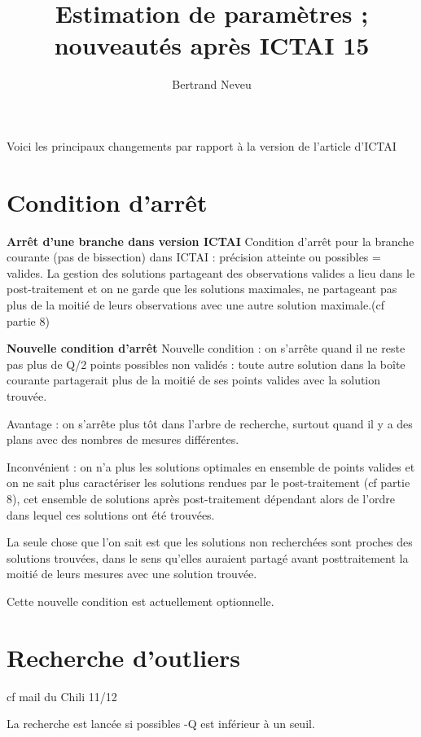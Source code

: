 \documentclass{article}
\title {Estimation de param\`etres ;  nouveaut\'es apr\`es ICTAI 15}
\author{Bertrand Neveu}
\begin{document}
\maketitle

Voici les principaux changements par rapport \`a la version de l'article d'ICTAI

\section{Condition d'arr\^et}


{\bf Arr\^et d'une branche dans version ICTAI}
   Condition d'arr\^et pour la branche courante (pas de bissection) dans ICTAI : pr\'ecision atteinte ou possibles = valides.
 La gestion des solutions partageant des observations valides a lieu dans le post-traitement et on ne garde
que les solutions maximales, ne partageant pas plus de la moiti\'e de leurs observations avec une autre solution maximale.(cf partie 8)

{\bf Nouvelle condition d'arr\^et}
   Nouvelle condition :  on s'arr\^ete quand il ne reste pas plus de Q/2 points possibles non valid\'es : 
   toute autre solution dans la bo\^ite courante partagerait plus de la moiti\'e de ses points valides avec la solution trouv\'ee.

   
Avantage : on s'arr\^ete plus t\^ot dans l'arbre de recherche, surtout quand il y a des plans avec des nombres
de mesures diff\'erentes.

Inconv\'enient : on n'a plus les solutions optimales en ensemble de points valides
   et on ne sait plus caract\'eriser les solutions rendues par le post-traitement (cf partie 8), cet ensemble
de solutions apr\`es post-traitement  d\'ependant alors de l'ordre dans lequel ces solutions ont \'et\'e trouv\'ees.

La seule chose que l'on sait est que les solutions non recherch\'ees sont proches des solutions
trouv\'ees, dans le sens qu'elles auraient partag\'e avant posttraitement la moiti\'e de leurs mesures
avec une solution trouv\'ee.

Cette nouvelle condition est actuellement optionnelle.

\section{Recherche d'outliers}

  cf mail du Chili  11/12

   La recherche est lanc\'ee si   possibles -Q  est inf\'erieur \`a un seuil.
\end{document}
